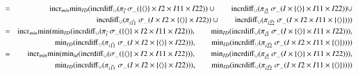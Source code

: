 \pagebreak
\begin{eqnarray*}
&=& \mathrm{incr}_{min} \mathrm{min}_{ID} ( \mathrm{incrdiff}_{\cup} (\pi_{\vec{i}} \;\sigma_{\dots}(  \{{\langle\rangle} \} \times I2 \times I11 \times I22)) \cup 
\qquad\mathrm{incrdiff}_{\cup} (\pi_{\vec{i2}} \;\sigma_{\dots}(I \times \{{\langle\rangle} \} \times I11 \times I22)) \cup 
\\&&\qquad\mathrm{incrdiff}_{\cup} (\pi_{\vec{i11}} \;\sigma_{\dots}(I \times  I2 \times  \{{\langle\rangle} \} \times I22)) \cup 
\qquad\mathrm{incrdiff}_{\cup} (\pi_{\vec{i22}} \;\sigma_{ \dots}(I \times I2 \times I11 \times \{{\langle\rangle} \} )))\\
&=& \mathrm{incr}_{min} \mathrm{min} (\mathrm{min}_{ID} (\mathrm{incrdiff}_{\cup} (\pi_{\vec{i}} \;\sigma_{\dots}(  \{{\langle\rangle} \} \times I2 \times I11 \times I22))) , 
\qquad\mathrm{min}_{ID}(\mathrm{incrdiff}_{\cup} (\pi_{\vec{i2}} \;\sigma_{\dots}(I \times \{{\langle\rangle} \} \times I11 \times I22))) ,
\\&&\qquad\mathrm{min}_{ID}(\mathrm{incrdiff}_{\cup} (\pi_{\vec{i11}} \;\sigma_{\dots}(I \times  I2 \times  \{{\langle\rangle} \} \times I22))) , 
\qquad\mathrm{min}_{ID}(\mathrm{incrdiff}_{\cup} (\pi_{\vec{i22}} \;\sigma_{ \dots}(I \times I2 \times I11 \times \{{\langle\rangle} \} ))))\\
&=& \mathrm{incr}_{min} \mathrm{min} (\mathrm{min}_{id} (\mathrm{incrdiff}_{\cup} (\sigma_{\dots}(  \{{\langle\rangle} \} \times I2 \times I11 \times I22))) , 
\qquad\mathrm{min}_{ID}(\mathrm{incrdiff}_{\cup} (\pi_{\vec{i2}} \;\sigma_{\dots}(I \times \{{\langle\rangle} \} \times I11 \times I22))) ,
\\&&\qquad\mathrm{min}_{ID}(\mathrm{incrdiff}_{\cup} (\pi_{\vec{i11}} \;\sigma_{\dots}(I \times  I2 \times  \{{\langle\rangle} \} \times I22))) , 
\qquad\mathrm{min}_{ID}(\mathrm{incrdiff}_{\cup} (\pi_{\vec{i22}} \;\sigma_{ \dots}(I \times I2 \times I11 \times \{{\langle\rangle} \} ))))
\end{eqnarray*}
